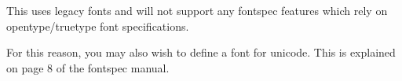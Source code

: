 \documentclass{article}
\begin{document}
This uses legacy fonts and will not support any fontspec features which rely on opentype/truetype font specifications.

{\unicodefont For this reason, you may also wish to define a font for unicode. This is explained on page 8 of the fontspec manual.}
\end{document}
